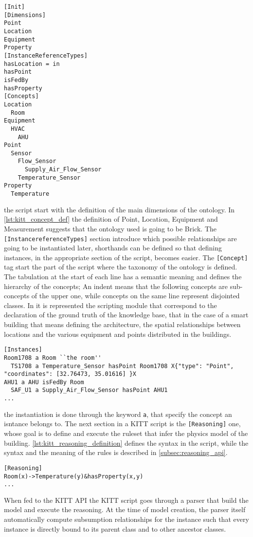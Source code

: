 \begin{lstlisting}[label={lst:kitt_concept_def}, caption={KITT script for domain definition}, breaklines=true]
[Init]
[Dimensions]
Point
Location
Equipment
Property
[InstanceReferenceTypes]
hasLocation = in
hasPoint
isFedBy
hasProperty
[Concepts]
Location
  Room
Equipment
  HVAC
    AHU
Point
  Sensor
    Flow_Sensor
      Supply_Air_Flow_Sensor
    Temperature_Sensor
Property
  Temperature
\end{lstlisting}
the script start with the definition of the main dimensions of the ontology. In \autoref{lst:kitt_concept_def} the definition of Point, Location, Equipment and Measurement suggests that the ontology used is going to be Brick. The \verb|[InstancereferenceTypes]| section introduce which possible relationships are going to be instantiated later, shorthands can be defined so that defining instances, in the appropriate section of the script, becomes easier. The \verb|[Concept]| tag start the part of the script where the taxonomy of the ontology is defined. The tabulation at the start of each line has a semantic meaning and defines the hierarchy of the concepts; An indent means that the following concepts are sub-concepts of the upper one, while concepts on the same line represent disjointed classes. In it is represented the scripting module that correspond to the declaration of the ground truth of the knowledge base, that in the case of a smart building that means defining the architecture, the spatial relationships between locations and the various equipment and points distributed in the buildings.
\begin{lstlisting}[label={lst:kitt_instance_definition}, caption={Definition of instances}, breaklines=true]
[Instances]
Room1708 a Room ``the room''
  TS1708 a Temperature_Sensor hasPoint Room1708 X{"type": "Point", "coordinates": [32.76473, 35.01616] }X
AHU1 a AHU isFedBy Room
  SAF_U1 a Supply_Air_Flow_Sensor hasPoint AHU1
...
\end{lstlisting}
the instantiation is done through the keyword \verb|a|, that specify the concept an isntance belongs to.
The next section in a KITT script is the \verb|[Reasoning]| one, whose goal is to define and execute the ruleset that infer the physics model of the building. \autoref{lst:kitt_reasoning_definition} defines the syntax in the script, while the syntax and the meaning of the rules is described in \autoref{subsec:reasoning_api}.
\begin{lstlisting}[label={lst:kitt_reasoning_definition}, caption={Definition of reasoning ruleset}, breaklines=true]
[Reasoning]
Room(x)->Temperature(y)&hasProperty(x,y)
...
\end{lstlisting}
When fed to the KITT API the KITT script goes through a parser that build the model and execute the reasoning. At the time of model creation, the parser itself automatically compute subsumption relationships for the instance such that every instance is directly bound to its parent class and to other ancestor classes.


